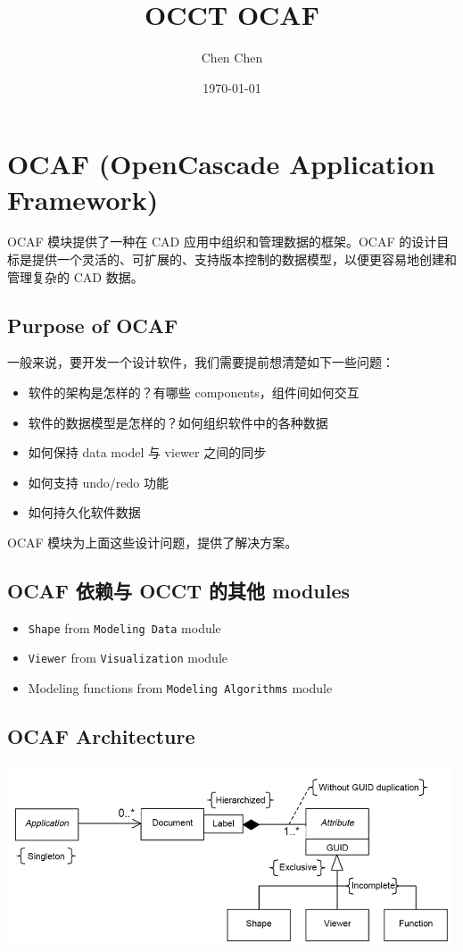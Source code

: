 \documentclass[11pt]{article}
\author{Chen Chen}
\date{\today}
\title{OCCT OCAF}
\begin{document}
\maketitle
\tableofcontents

\section{OCAF (OpenCascade Application Framework)}
\label{sec:org4d6b0c6}

OCAF 模块提供了一种在 CAD 应用中组织和管理数据的框架。OCAF 的设计目标是提供一个灵活的、可扩展的、支持版本控制的数据模型，以便更容易地创建和管理复杂的 CAD 数据。
\subsection{Purpose of OCAF}
\label{sec:orgfa06bf8}

一般来说，要开发一个设计软件，我们需要提前想清楚如下一些问题：

\begin{itemize}
\item 软件的架构是怎样的？有哪些 components，组件间如何交互
\item 软件的数据模型是怎样的？如何组织软件中的各种数据
\item 如何保持 data model 与 viewer 之间的同步
\item 如何支持 undo/redo 功能
\item 如何持久化软件数据
\end{itemize}

OCAF 模块为上面这些设计问题，提供了解决方案。
\subsection{OCAF 依赖与 OCCT 的其他 modules}
\label{sec:org89c7a89}

\begin{itemize}
\item \texttt{Shape} from \texttt{Modeling Data} module
\item \texttt{Viewer} from \texttt{Visualization} module
\item Modeling functions from \texttt{Modeling Algorithms} module
\end{itemize}
\subsection{OCAF Architecture}
\label{sec:org0852e15}

\begin{center}
\includegraphics[width=.9\linewidth]{./img/application-document-attribute-model.png}
\end{center}
\end{document}
